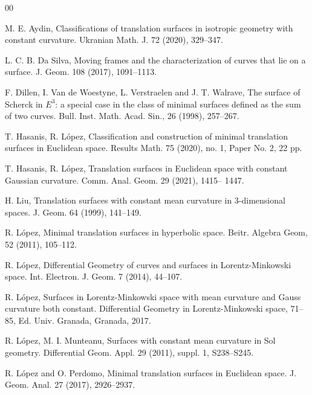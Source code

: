 \documentclass[a4paper,12pt]{amsart}
\numberwithin{equation}{section}
\theoremstyle{definition}
\begin{document}
\begin{thebibliography}{00}

  M. E. Aydin, Classifications of translation surfaces in isotropic geometry with constant curvature. Ukranian Math. J. 72 (2020), 329--347.
 
  L. C. B. Da Silva,   Moving frames and the characterization of curves that lie on a surface. J. Geom. 108 (2017),   1091--1113.
 
 F. Dillen, I. Van de Woestyne, L. Verstraelen and J. T. Walrave, The surface of Scherck in $E^3$: a special case in the class of minimal surfaces defined as the sum of two curves. Bull. Inst. Math. Acad. Sin., 26 (1998), 257--267.


 T. Hasanis, R. L\'opez, Classification and construction of minimal translation surfaces in Euclidean space. Results Math. 75 (2020), no. 1, Paper No. 2, 22 pp.

 T. Hasanis, R. L\'opez, Translation surfaces in Euclidean space with constant Gaussian curvature.  Comm. Anal. Geom. 29 (2021),  1415-- 1447.



 H. Liu, Translation surfaces with constant mean curvature in 3-dimensional spaces. J. Geom. 64 (1999), 141--149.

 R. L\'opez, Minimal translation surfaces in hyperbolic space. Beitr. Algebra Geom, 52 (2011), 105--112.

 R. L\'opez,  Differential Geometry of curves and surfaces in Lorentz-Minkowski space. Int. Electron. J. Geom.   7 (2014), 44--107.

 R. L\'opez,   Surfaces in Lorentz-Minkowski space with mean curvature and Gauss curvature both constant. Differential Geometry in Lorentz-Minkowski space, 71--85, Ed. Univ. Granada, Granada, 2017. 

 R. L\'opez, M. I.  Munteanu, Surfaces with constant mean curvature in Sol geometry. Differential Geom. Appl. 29 (2011), suppl. 1, S238--S245.

  R. L\'opez and O. Perdomo,   Minimal translation surfaces in Euclidean space. J. Geom. Anal. 27 (2017), 2926--2937.


\end{thebibliography}
\end{document}
